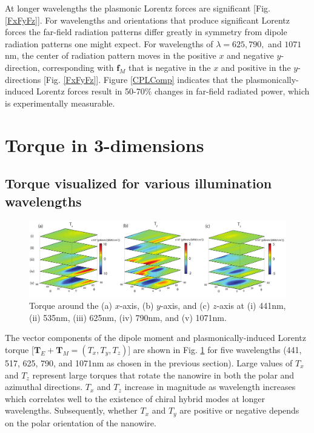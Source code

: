At longer wavelengths the plasmonic Lorentz forces are significant [Fig. \ref{FxFyFz}]. For wavelengths and orientations that produce significant Lorentz forces the far-field radiation patterns differ greatly in symmetry from dipole radiation patterns one might expect. For wavelengths of $\lambda = 625, 790,$ and $1071$nm, the center of radiation pattern moves in the positive $x$ and negative $y$-direction, corresponding with $\mathbf{f}_M$ that is negative in the $x$ and positive in the $y$-directions [Fig. \ref{FxFyFz}].
Figure \ref{CPLComp} indicates that the plasmonically-induced Lorentz forces result in 50-70$\%$ changes in far-field radiated power, which is experimentally measurable.


\section{Torque in 3-dimensions}\label{3D}
\subsection{Torque visualized for various illumination wavelengths}
\begin{figure}[b]
\centering\includegraphics[width = \textwidth]{TNMT.pdf}
\caption{Torque around the (a) $x$-axis, (b) $y$-axis, and (c) $z$-axis at (i) 441nm, (ii) 535nm, (iii) 625nm, (iv) 790nm, and (v) 1071nm.}\label{TNW}
\end{figure}


The vector components of the dipole moment and plasmonically-induced Lorentz torque [$\mathbf{T}_E +\mathbf{T}_M = (T_x,T_y,T_z)$] are shown in Fig. \ref{TNW} for five wavelengths (441, 517, 625, 790, and 1071nm as chosen in the previous section).  Large values of $T_x$ and $T_z$ represent large torques that rotate the nanowire in both the polar and azimuthal directions. $T_x$ and $T_z$ increase in magnitude as wavelength increases which correlates well to the existence of chiral hybrid modes at longer wavelengths. Subsequently, whether $T_x$ and $T_y$ are positive or negative depends on the polar orientation of the nanowire.

